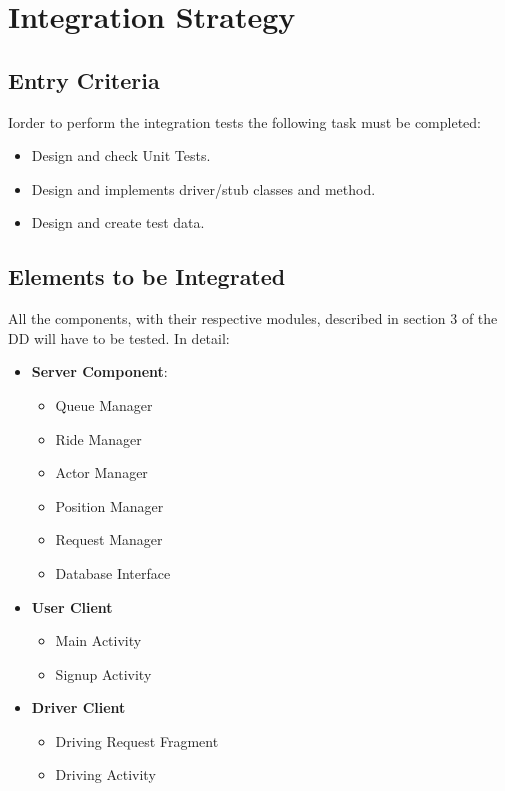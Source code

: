 \section{Integration Strategy} %
\label{sec:integration_strategy}

\subsection{Entry Criteria} %
\label{sub:entry_criteria}
Iorder to perform the integration tests the following task must be completed:
\begin{itemize}
	\item Design and check Unit Tests.
	\item Design and implements driver/stub classes and method.
	\item Design and create test data.
\end{itemize}

\subsection{Elements to be Integrated} %
\label{sub:elements_to_be_integrated}
All the components, with their respective modules, described in section 3 of the DD will have to be tested.
In detail:
\begin{itemize}
	\item \textbf{Server Component}:
	\begin{itemize}
		\item Queue Manager
		\item Ride Manager
		\item Actor Manager
		\item Position Manager
		\item Request Manager
		\item Database Interface
	\end{itemize}
	\item \textbf{User Client}
	\begin{itemize}
		\item Main Activity
		\item Signup Activity
	\end{itemize}
	\item \textbf{Driver Client}
	\begin{itemize}
		\item Driving Request Fragment
		\item Driving Activity
	\end{itemize}
\end{itemize}

